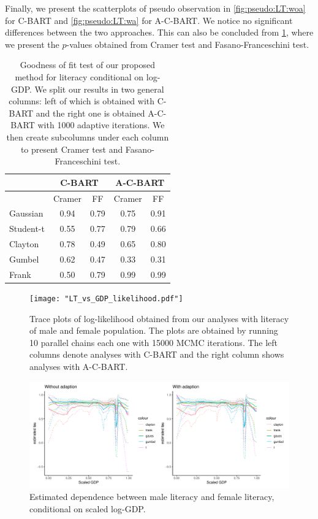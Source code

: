 \documentclass{amsart}
\begin{document}
Finally, we present the scatterplots of pseudo observation in \cref{fig:pseudo:LT:woa} for C-BART and \cref{fig:pseudo:LT:wa} for A-C-BART. We notice no significant differences between the two approaches. This can also be concluded from \cref{tab:LT:p-val}, where we present the $p$-values obtained from Cramer test and Fasano-Franceschini test.

\begin{table}
	\centering
	\centering
	\begin{tabular}{l|cc|cc}
		\multicolumn{1}{c|}{} &
		\multicolumn{2}{c|}{C-BART} &
		\multicolumn{2}{c}{A-C-BART} \\
		\midrule
		& Cramer & FF & Cramer & FF \\ 
		\midrule
		Gaussian & 0.94 & 0.79 & 0.75 & 0.91 \\ 
		Student-t & 0.55 & 0.77 & 0.79 & 0.66 \\ 
		Clayton & 0.78 & 0.49 & 0.65 & 0.80 \\ 
		Gumbel & 0.62 & 0.47 & 0.33 & 0.31 \\ 
		Frank & 0.50 & 0.79 & 0.99 & 0.99 \\ 
	\end{tabular}
	\caption{Goodness of fit test of our proposed method for literacy conditional on log-GDP. We split our results in two general columns: left of which is obtained with C-BART and the right one is obtained A-C-BART with 1000 adaptive iterations. We then create subcolumns under each column to present Cramer test and Fasano-Franceschini test.}
	\label{tab:LT:p-val}
\end{table}

\begin{figure}
	\centering
	\texttt{[image: "LT\_vs\_GDP\_likelihood.pdf"]}
	\caption{Trace plots of log-likelihood obtained from our analyses with literacy of male and female population. The plots are obtained by running 10 parallel chains each one with 15000 MCMC iterations. The left columns denote analyses with C-BART and the right column shows analyses with A-C-BART.}
	\label{fig:trace:like:real:LT}
\end{figure}

\begin{figure}
	\centering
	\includegraphics[width = 0.95\linewidth]{"LT_vs_GDP_taus.pdf"}
	\caption{Estimated dependence between male literacy and female literacy, conditional on scaled log-GDP.}
	\label{fig:taus:LT}
\end{figure}
\end{document}

